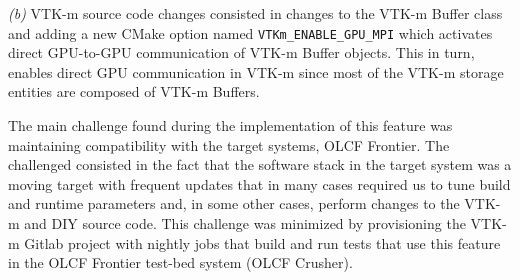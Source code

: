 \textit{(b)} VTK-m source code changes consisted in changes to the VTK-m Buffer class and  adding a new CMake option named \texttt{VTKm\_ENABLE\_GPU\_MPI} which activates direct GPU-to-GPU communication of VTK-m Buffer objects. This in turn, enables direct GPU communication in VTK-m since most of the VTK-m storage entities are composed of VTK-m Buffers. 

The main challenge found during the implementation of this feature was maintaining compatibility with the target systems, OLCF Frontier. The challenged consisted in the fact that the software stack in the target system was a moving target with frequent updates that in many cases required us to tune build and runtime parameters and, in some other cases, perform changes to the VTK-m and DIY source code. This challenge was minimized by provisioning the VTK-m Gitlab project with nightly jobs that build and run tests that use this feature in the OLCF Frontier test-bed system (OLCF Crusher). 
